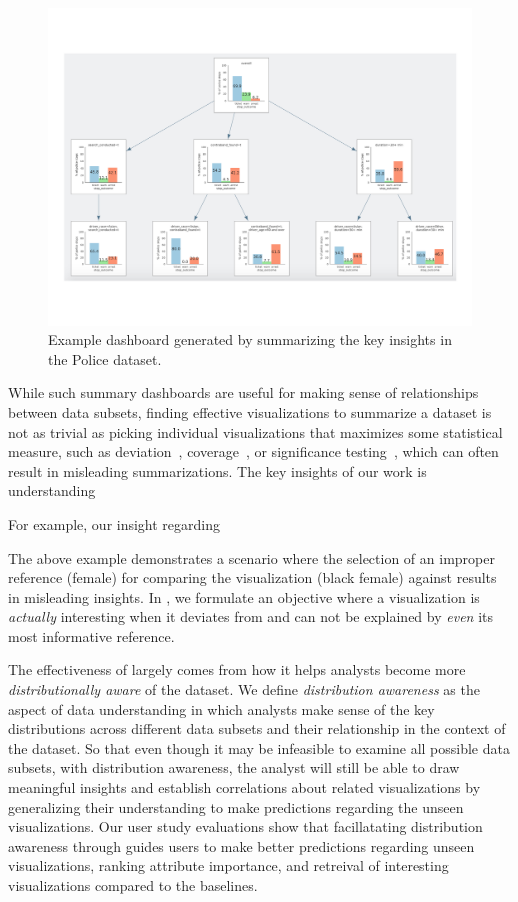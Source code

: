 \begin{figure}[h!]
\label{fig:sbd}
\centering
\includegraphics[width=0.7\linewidth]{figures/storyboard.pdf}
\caption{Example dashboard generated by \sbd summarizing the key insights in the Police dataset.}
\end{figure} 
\par While such summary dashboards are useful for making sense of relationships between data subsets, finding effective visualizations to summarize a dataset is not as trivial as picking individual visualizations that maximizes some statistical measure, such as deviation~\cite{Vartak2015}, coverage~\cite{Sarvghad2017}, or significance testing~\cite{Anand2015}, which can often result in misleading summarizations. The key insights of our work is understanding 

For example, our insight regarding 

The above example demonstrates a scenario where the selection of an improper reference (female) for comparing the visualization (black female) against results in misleading insights. In \sbd, we formulate an objective where a visualization is \emph{actually} interesting when it deviates from and can not be explained by \emph{even} its most informative reference.

\par The effectiveness of \sbd largely comes from how it helps analysts become more \emph{distributionally aware} of the dataset. We define \emph{distribution awareness} as the aspect of data understanding in which analysts make sense of the key distributions across different data subsets and their relationship in the context of the dataset. So that even though it may be infeasible to examine all possible data subsets, with distribution awareness, the analyst will still be able to draw meaningful insights and establish correlations about related visualizations by generalizing their understanding to make predictions regarding the unseen visualizations. Our user study evaluations show that facillatating distribution awareness through \sbd guides users to make better predictions regarding unseen visualizations, ranking attribute importance, and retreival of interesting visualizations compared to the baselines.


